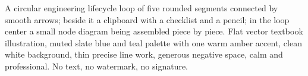A circular engineering lifecycle loop of five rounded segments connected by smooth arrows; beside it a clipboard with a checklist and a pencil; in the loop center a small node diagram being assembled piece by piece. Flat vector textbook illustration, muted slate blue and teal palette with one warm amber accent, clean white background, thin precise line work, generous negative space, calm and professional. No text, no watermark, no signature.
